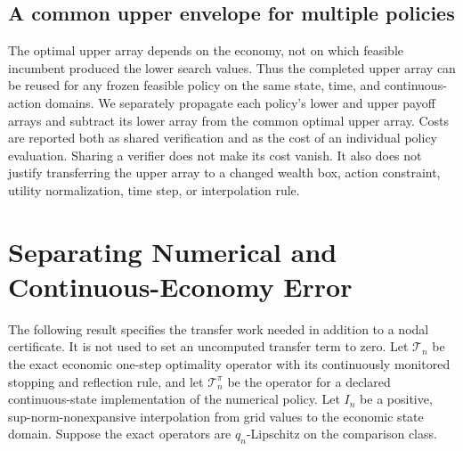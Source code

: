 \subsection{A common upper envelope for multiple policies}
The optimal upper array depends on the economy, not on which feasible incumbent produced the lower search values. Thus the completed upper array can be reused for any frozen feasible policy on the same state, time, and continuous-action domains. We separately propagate each policy's lower and upper payoff arrays and subtract its lower array from the common optimal upper array. Costs are reported both as shared verification and as the cost of an individual policy evaluation. Sharing a verifier does not make its cost vanish. It also does not justify transferring the upper array to a changed wealth box, action constraint, utility normalization, time step, or interpolation rule.

\section{Separating Numerical and Continuous-Economy Error}\label{supp:r8-transfer}
The following result specifies the transfer work needed in addition to a nodal certificate. It is not used to set an uncomputed transfer term to zero. Let $\mathcal T_n$ be the exact economic one-step optimality operator with its continuously monitored stopping and reflection rule, and let $\mathcal T_n^{\pi}$ be the operator for a declared continuous-state implementation of the numerical policy. Let $I_n$ be a positive, sup-norm-nonexpansive interpolation from grid values to the economic state domain. Suppose the exact operators are $q_n$-Lipschitz on the comparison class.


